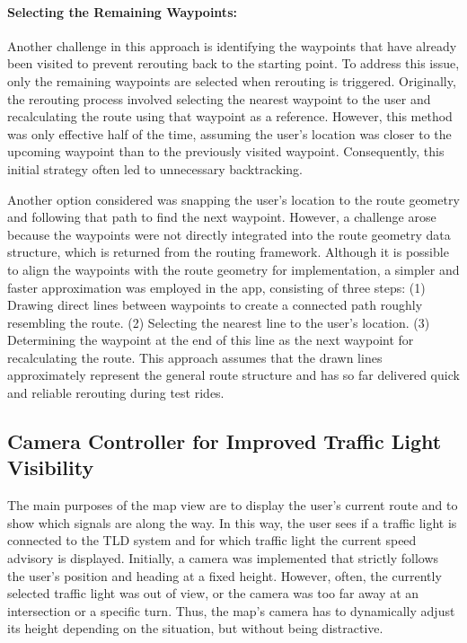\paragraph{Selecting the Remaining Waypoints:} Another challenge in this approach is identifying the waypoints that have already been visited to prevent rerouting back to the starting point. To address this issue, only the remaining waypoints are selected when rerouting is triggered. Originally, the rerouting process involved selecting the nearest waypoint to the user and recalculating the route using that waypoint as a reference. However, this method was only effective half of the time, assuming the user's location was closer to the upcoming waypoint than to the previously visited waypoint. Consequently, this initial strategy often led to unnecessary backtracking.

Another option considered was snapping the user's location to the route geometry and following that path to find the next waypoint. However, a challenge arose because the waypoints were not directly integrated into the route geometry data structure, which is returned from the routing framework. Although it is possible to align the waypoints with the route geometry for implementation, a simpler and faster approximation was employed in the app, consisting of three steps: (1) Drawing direct lines between waypoints to create a connected path roughly resembling the route. (2) Selecting the nearest line to the user's location. (3) Determining the waypoint at the end of this line as the next waypoint for recalculating the route. This approach assumes that the drawn lines approximately represent the general route structure and has so far delivered quick and reliable rerouting during test rides.

\subsection{Camera Controller for Improved Traffic Light Visibility}

The main purposes of the map view are to display the user's current route and to show which signals are along the way. In this way, the user sees if a traffic light is connected to the TLD system and for which traffic light the current speed advisory is displayed. Initially, a camera was implemented that strictly follows the user's position and heading at a fixed height. However, often, the currently selected traffic light was out of view, or the camera was too far away at an intersection or a specific turn. Thus, the map's camera has to dynamically adjust its height depending on the situation, but without being distractive.

